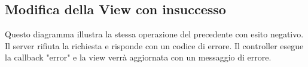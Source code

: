 \subsection{Modifica della View con insuccesso}
Questo diagramma illustra la stessa operazione del precedente con esito negativo. Il server rifiuta la richiesta e risponde con un codice di errore.
Il controller esegue la callback "error" e la view verrà aggiornata con un messaggio di errore.

